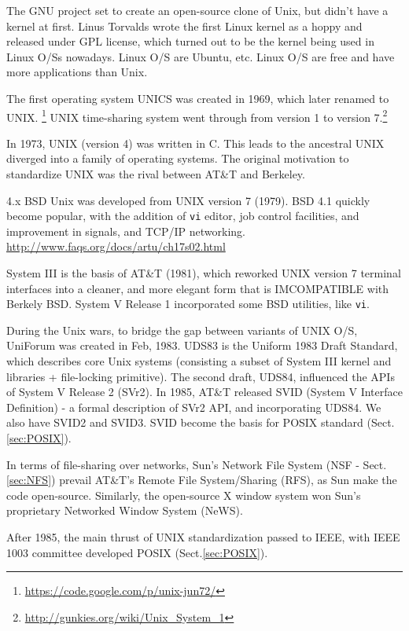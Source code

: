 The GNU project set to create an open-source clone of Unix, but didn't have a
kernel at first. Linus Torvalds wrote the first Linux kernel as a hoppy and
released under GPL license, which turned out to be the kernel being used in
Linux O/Ss nowadays. Linux O/S are Ubuntu, etc. Linux O/S are free and have more
applications than Unix.

\begin{mdframed}
The first operating system UNICS was created in 1969, which later renamed to
UNIX. \footnote{\url{https://code.google.com/p/unix-jun72/}} UNIX time-sharing
system went through from version 1 to version
7.\footnote{\url{http://gunkies.org/wiki/Unix_System_1}}

In 1973, UNIX (version 4) was written in C. This leads to the ancestral UNIX
diverged into a family of operating systems. The original motivation to
standardize UNIX was the rival between AT\&T and Berkeley.

4.x BSD Unix was developed from UNIX version 7 (1979). BSD 4.1 quickly become
popular, with the addition of \verb!vi! editor, job control facilities, and
improvement in signals, and TCP/IP networking.
\url{http://www.faqs.org/docs/artu/ch17s02.html}

System III is the basis of AT\&T (1981), which reworked UNIX version 7 terminal
interfaces into a cleaner, and more elegant form that is IMCOMPATIBLE with
Berkely BSD. System V Release 1 incorporated some BSD utilities, like \verb!vi!.

During the Unix wars, to bridge the gap between variants of UNIX O/S, UniForum
was created in Feb, 1983. UDS83 is the Uniform 1983 Draft Standard, which
describes core Unix systems (consisting a subset of System III kernel and
libraries + file-locking primitive). The second draft, UDS84, influenced the
APIs of System V Release 2 (SVr2). In 1985, AT\&T released SVID (System V
Interface Definition) - a formal description of SVr2 API, and incorporating
UDS84. We also have SVID2 and SVID3. SVID become the basis for POSIX standard
(Sect.\ref{sec:POSIX}).

In terms of file-sharing over networks, Sun's Network File System (NSF -
Sect.\ref{sec:NFS}) prevail AT\&T's Remote File System/Sharing (RFS), as Sun
make the code open-source. Similarly, the open-source X window system won Sun's
proprietary Networked Window System (NeWS).

After 1985, the main thrust of UNIX standardization passed to IEEE, with IEEE
1003 committee developed POSIX (Sect.\ref{sec:POSIX}).
\end{mdframed}


